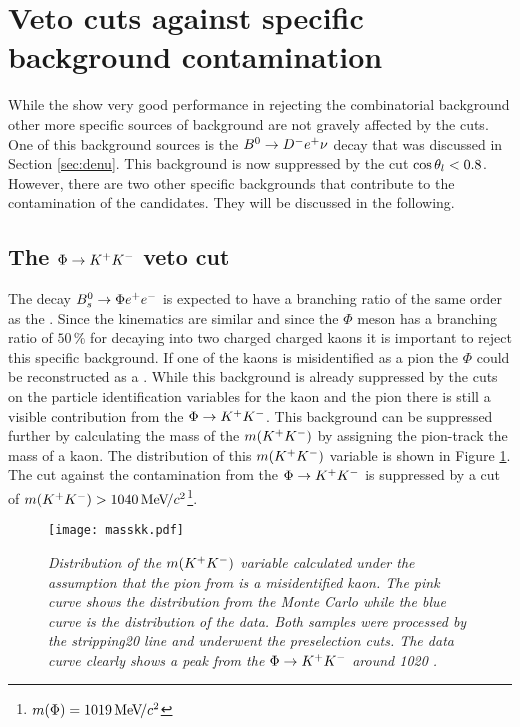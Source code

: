 \section{Veto cuts against specific background contamination}
While the \bdts show very good performance in rejecting the combinatorial background other more specific sources of background are not gravely affected by the \bdtn cuts. One of this background sources is the $B^0 \rightarrow D^- e^+ \nu$ decay that was discussed in Section \ref{sec:denu}. This background is now suppressed by the cut $\cos{\theta_l} <0.8$.\\
However, there are two other specific backgrounds that contribute to the contamination of the \BdKstee candidates. They will be discussed in the following.\\

\subsection{The $\Phi \rightarrow K^+ K^-$ veto cut}
The decay $B^0_s \rightarrow \Phi e^+e^-$ is expected to have a branching ratio of the same order as the \BdKstee. Since the kinematics are similar and since
the $\Phi$ meson has a branching ratio of $50\, \%$ for decaying into two charged charged kaons it is important to reject this specific background. If one of the kaons is misidentified as a pion the $\Phi$ could be reconstructed as a \Kstarz. While this background is already suppressed by the cuts on the particle identification variables for the kaon and the pion there is still a visible contribution from the $\Phi \rightarrow K^+ K^-$. This background can be suppressed further by calculating the mass of the $m(K^+ K^-)$ by assigning the pion-track the mass of a kaon. The distribution of this $m(K^+ K^-)$ variable is shown in Figure \ref{fig:masskk}. \\
The cut against the contamination from the $\Phi \rightarrow K^+ K^-$ is suppressed by a cut of $m(K^+ K^-)>1040{\mathrm{\,Me\kern -0.1em V\!/}c^2}$\footnote{$m(\Phi) = 1019 {\mathrm{\,Me\kern -0.1em V\!/}c^2}$\cite{pdg}}.\newpage
\begin{figure}[ht]
\begin{center}
\texttt{[image: masskk.pdf]}
\end{center}
\vspace*{-0.8cm}
\caption{\textit{Distribution of the $m(K^+ K^-)$ variable calculated under the assumption that the pion from \BdKstee is a misidentified kaon. The pink curve shows the distribution from the \BdKstee Monte Carlo while the blue curve is the distribution of the \lhcb data. Both samples were processed by the \BdKstee stripping20 line and underwent the preselection cuts. The data curve clearly shows a peak from the $\Phi \rightarrow K^+ K^-$ around 1020 \mevcc.}}
\label{fig:masskk}
\vspace*{1.5cm}
\end{figure}

